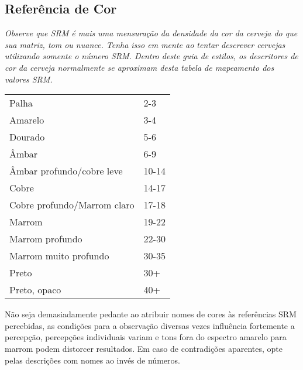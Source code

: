 \subsection*{Referência de Cor}
\textit{Observe que SRM é mais uma mensuração da densidade da cor da cerveja do que sua matriz, tom ou nuance. Tenha isso em mente ao tentar descrever cervejas utilizando somente o número SRM. Dentro deste guia de estilos, os descritores de cor da cerveja normalmente se aproximam desta tabela de mapeamento dos valores SRM.}\\
\begin{tabular}{ l l }
Palha & 2-3 \\
Amarelo & 3-4 \\
Dourado & 5-6 \\
Âmbar & 6-9 \\
Âmbar profundo/cobre leve & 10-14 \\
Cobre & 14-17 \\
Cobre profundo/Marrom claro & 17-18 \\
Marrom & 19-22 \\
Marrom profundo & 22-30 \\
Marrom muito profundo & 30-35 \\
Preto & 30+ \\
Preto, opaco & 40+
\end{tabular}

Não seja demasiadamente pedante ao atribuir nomes de cores às referências SRM percebidas, as condições para a observação diversas vezes influência fortemente a percepção, percepções individuais variam e tons fora do espectro amarelo para marrom podem distorcer resultados. Em caso de contradições aparentes, opte pelas descrições com nomes ao invés de números.

